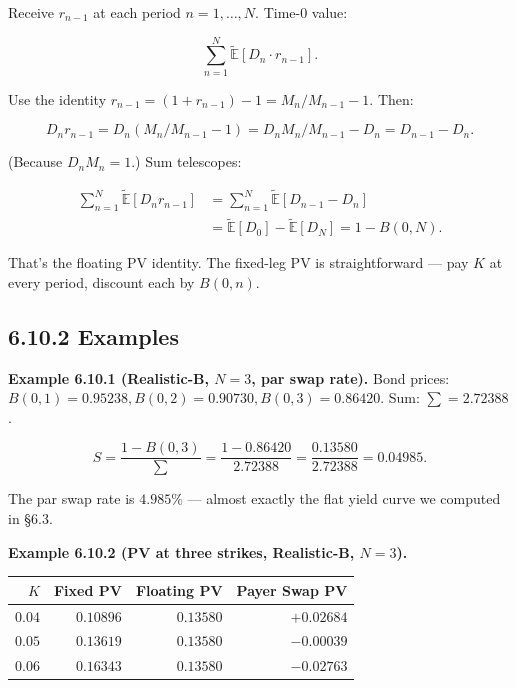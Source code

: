 \documentclass[
  10pt,
  twoside]{book}
\newcounter{none} %
\begin{document}
Receive \(r_{n-1}\) at each period \(n = 1, \ldots, N\). Time-0 value:

\[\sum_{n=1}^{N} \tilde{\mathbb E}[D_n \cdot r_{n-1}].\]

Use the identity \(r_{n-1} = (1 + r_{n-1}) - 1 = M_n/M_{n-1} - 1\).
Then:

\[D_n r_{n-1} = D_n (M_n/M_{n-1} - 1) = D_n M_n/M_{n-1} - D_n = D_{n-1} - D_n.\]

(Because \(D_n M_n = 1\).) Sum telescopes:

\[\begin{aligned}
\sum_{n=1}^{N}\tilde{\mathbb E}[D_n r_{n-1}] &= \sum_{n=1}^{N}\tilde{\mathbb E}[D_{n-1} - D_n] \\
&= \tilde{\mathbb E}[D_0] - \tilde{\mathbb E}[D_N] = 1 - B(0, N).
\end{aligned}\]

That's the floating PV identity. The fixed-leg PV is straightforward ---
pay \(K\) at every period, discount each by \(B(0, n)\).

\subsection{6.10.2 Examples}\label{examples-33}

\textbf{Example 6.10.1 (Realistic-B, \(N = 3\), par swap rate).} Bond
prices: \(B(0, 1) = 0.95238, B(0, 2) = 0.90730, B(0, 3) = 0.86420\).
Sum: \(\sum = 2.72388\).

\[S = \frac{1 - B(0, 3)}{\sum} = \frac{1 - 0.86420}{2.72388} = \frac{0.13580}{2.72388} = 0.04985.\]

The par swap rate is \(4.985\%\) --- almost exactly the flat yield curve
we computed in §6.3.

\textbf{Example 6.10.2 (PV at three strikes, Realistic-B, \(N = 3\)).}

{\def\LTcaptype{none} %
\begin{table}[H]
\centering
\begin{tabular}{|r|r|r|r|}
\toprule
\(K\) & Fixed PV & Floating PV & Payer Swap PV \\
\midrule



\(0.04\) & \(0.10896\) & \(0.13580\) & \(+0.02684\) \\
\(0.05\) & \(0.13619\) & \(0.13580\) & \(-0.00039\) \\
\(0.06\) & \(0.16343\) & \(0.13580\) & \(-0.02763\) \\
\bottomrule
\end{tabular}
\end{table}
}
\end{document}
